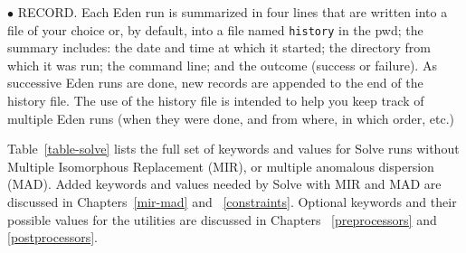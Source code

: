 \documentclass{report}
\begin{document}
$\bullet$ RECORD.
Each Eden run is summarized in four lines that are written
into a file of your choice or, by default, into a file named {\tt history} in
the pwd;  the summary includes: the date and time at which
it started; the directory from which it was run; the command line; and
the outcome (success or failure).  As successive Eden runs are done, new
records are appended to the end of the history file.  The use of the history
file is intended to help you keep track of multiple Eden runs 
(when they were done, and from where, in which order, etc.)

\vspace {0.1in}

Table~\ref{table-solve} lists the full set of keywords and values 
for Solve runs without Multiple Isomorphous Replacement 
(MIR), or multiple anomalous dispersion (MAD).
Added keywords and values needed by Solve 
with MIR and MAD  
are discussed in Chapters~\ref{mir-mad} and ~\ref{constraints}.  
Optional keywords and their possible values for the utilities
are discussed in Chapters~
\ref{preprocessors} and \ref{postprocessors}.
\end{document}

